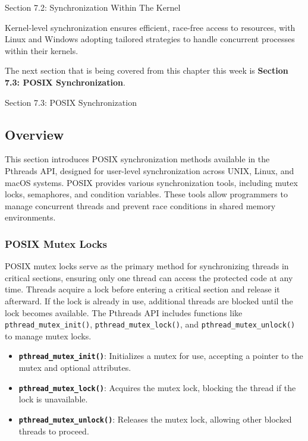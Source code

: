 \begin{notes}{Section 7.2: Synchronization Within The Kernel}
\begin{highlight}
    Kernel-level synchronization ensures efficient, race-free access to resources, with Linux and Windows adopting tailored strategies to handle concurrent processes within their kernels.
    
    \end{highlight}
\end{notes}

The next section that is being covered from this chapter this week is \textbf{Section 7.3: POSIX Synchronization}.

\begin{notes}{Section 7.3: POSIX Synchronization}
    \subsection*{Overview}

    This section introduces POSIX synchronization methods available in the Pthreads API, designed for user-level synchronization across UNIX, Linux, and macOS systems. POSIX provides various synchronization 
    tools, including mutex locks, semaphores, and condition variables. These tools allow programmers to manage concurrent threads and prevent race conditions in shared memory environments.
    
    \subsubsection*{POSIX Mutex Locks}
    
    POSIX mutex locks serve as the primary method for synchronizing threads in critical sections, ensuring only one thread can access the protected code at any time. Threads acquire a lock before entering 
    a critical section and release it afterward. If the lock is already in use, additional threads are blocked until the lock becomes available. The Pthreads API includes functions like 
    \texttt{pthread\_mutex\_init()}, \texttt{pthread\_mutex\_lock()}, and \texttt{pthread\_mutex\_unlock()} to manage mutex locks.
    
    \begin{highlight}
    
        \begin{itemize}
            \item \textbf{\texttt{pthread\_mutex\_init()}}: Initializes a mutex for use, accepting a pointer to the mutex and optional attributes.
            \item \textbf{\texttt{pthread\_mutex\_lock()}}: Acquires the mutex lock, blocking the thread if the lock is unavailable.
            \item \textbf{\texttt{pthread\_mutex\_unlock()}}: Releases the mutex lock, allowing other blocked threads to proceed.
        \end{itemize}
    

\end{highlight}
\end{notes}

